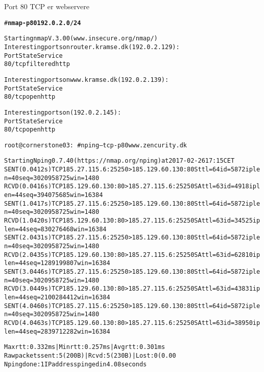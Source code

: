 \documentclass[20pt,landscape,a4paper,footrule]{foils}
\begin{document}

\centerline{}



\begin{list1}
  \item Port 80 TCP er webservere
\end{list1}

\begin{alltt}
\small # {\bfseries nmap  -p 80 192.0.2.0/24}

Starting nmap V. 3.00 ( www.insecure.org/nmap/ )
Interesting ports on router.kramse.dk (192.0.2.129):
Port       State       Service
80/tcp     filtered    http

Interesting ports on www.kramse.dk (192.0.2.139):
Port       State       Service
80/tcp     open        http

Interesting ports on  (192.0.2.145):
Port       State       Service
80/tcp     open        http

\end{alltt}



\begin{alltt}\tiny
root@cornerstone03:~# nping --tcp -p80 www.zencurity.dk

Starting Nping 0.7.40 ( https://nmap.org/nping ) at 2017-02-26 17:15 CET
SENT (0.0412s) TCP 185.27.115.6:25250 > 185.129.60.130:80 S ttl=64 id=5872 iplen=40  seq=3020958725 win=1480
RCVD (0.0416s) TCP 185.129.60.130:80 > 185.27.115.6:25250 SA ttl=63 id=4918 iplen=44  seq=394075685 win=16384
SENT (1.0417s) TCP 185.27.115.6:25250 > 185.129.60.130:80 S ttl=64 id=5872 iplen=40  seq=3020958725 win=1480
RCVD (1.0420s) TCP 185.129.60.130:80 > 185.27.115.6:25250 SA ttl=63 id=34525 iplen=44  seq=830276468 win=16384
SENT (2.0431s) TCP 185.27.115.6:25250 > 185.129.60.130:80 S ttl=64 id=5872 iplen=40  seq=3020958725 win=1480
RCVD (2.0435s) TCP 185.129.60.130:80 > 185.27.115.6:25250 SA ttl=63 id=62810 iplen=44  seq=1289199807 win=16384
SENT (3.0446s) TCP 185.27.115.6:25250 > 185.129.60.130:80 S ttl=64 id=5872 iplen=40  seq=3020958725 win=1480
RCVD (3.0449s) TCP 185.129.60.130:80 > 185.27.115.6:25250 SA ttl=63 id=43831 iplen=44  seq=2100284412 win=16384
SENT (4.0460s) TCP 185.27.115.6:25250 > 185.129.60.130:80 S ttl=64 id=5872 iplen=40  seq=3020958725 win=1480
RCVD (4.0463s) TCP 185.129.60.130:80 > 185.27.115.6:25250 SA ttl=63 id=38950 iplen=44  seq=2839712282 win=16384

Max rtt: 0.332ms | Min rtt: 0.257ms | Avg rtt: 0.301ms
Raw packets sent: 5 (200B) | Rcvd: 5 (230B) | Lost: 0 (0.00%)
Nping done: 1 IP address pinged in 4.08 seconds
\end{alltt}
\end{document}
